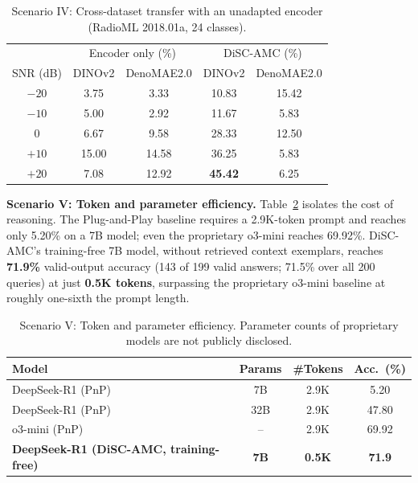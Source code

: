 \begin{table}[htbp]
\centering
\caption{Scenario IV: Cross-dataset transfer with an unadapted encoder (RadioML 2018.01a, 24 classes).}
\label{tab:disc_scenario4}
\begin{tabular}{c cc cc}
\toprule
 & \multicolumn{2}{c}{Encoder only (\%)} & \multicolumn{2}{c}{DiSC-AMC (\%)} \\
SNR (dB) & DINOv2 & DenoMAE2.0 & DINOv2 & DenoMAE2.0 \\
\midrule
$-20$ & 3.75  & 3.33  & 10.83 & 15.42 \\
$-10$ & 5.00  & 2.92  & 11.67 & 5.83 \\
$0$   & 6.67  & 9.58  & 28.33 & 12.50 \\
$+10$ & 15.00 & 14.58 & 36.25 & 5.83 \\
$+20$ & 7.08  & 12.92 & \textbf{45.42} & 6.25 \\
\bottomrule
\end{tabular}
\end{table}

\textbf{Scenario V: Token and parameter efficiency.} Table~\ref{tab:disc_scenario5} isolates the cost of reasoning. The Plug-and-Play baseline requires a 2.9K-token prompt and reaches only 5.20\% on a 7B model; even the proprietary o3-mini reaches 69.92\%. DiSC-AMC's training-free 7B model, without retrieved context exemplars, reaches \textbf{71.9\%} valid-output accuracy (143 of 199 valid answers; 71.5\% over all 200 queries) at just \textbf{0.5K tokens}, surpassing the proprietary o3-mini baseline at roughly one-sixth the prompt length.

\begin{table}[htbp]
\centering
\caption[Scenario V: Token and parameter efficiency.]{Scenario V: Token and parameter efficiency. Parameter counts of proprietary models are not publicly disclosed.}
\label{tab:disc_scenario5}
\begin{tabular}{lccc}
\toprule
Model & Params & \#Tokens & Acc.\ (\%) \\
\midrule
DeepSeek-R1 (PnP) & 7B & 2.9K & 5.20 \\
DeepSeek-R1 (PnP) & 32B & 2.9K & 47.80 \\
o3-mini (PnP) & -- & 2.9K & 69.92 \\
\textbf{DeepSeek-R1 (DiSC-AMC, training-free)} & \textbf{7B} & \textbf{0.5K} & \textbf{71.9} \\
\bottomrule
\end{tabular}
\end{table}

